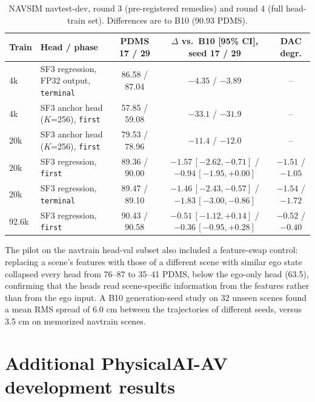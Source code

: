\documentclass[10pt]{article}
\newcommand{\first}{\texttt{first}}
\newcommand{\terminal}{\texttt{terminal}}
\begin{document}
\begin{table}[H]
\caption{NAVSIM navtest-dev, round 3 (pre-registered remedies) and round 4 (full head-train set). Differences are to B10 (90.93 PDMS).}
\begin{center}
\footnotesize
\setlength{\tabcolsep}{3pt}
\begin{tabular}{llccc}
\toprule
Train & Head / phase & PDMS 17 / 29 & $\Delta$ vs.\ B10 [95\% CI], seed 17 / 29 & DAC degr. \\
\midrule
4k & SF3 regression, FP32 output, \terminal{} & 86.58 / 87.04 & $-4.35$ / $-3.89$ & -- \\
4k & SF3 anchor head ($K$=256), \first{} & 57.85 / 59.08 & $-33.1$ / $-31.9$ & -- \\
20k & SF3 anchor head ($K$=256), \first{} & 79.53 / 78.96 & $-11.4$ / $-12.0$ & -- \\
20k & SF3 regression, \first{} & 89.36 / 90.00 & $-1.57\,[-2.62,-0.71]$ / $-0.94\,[-1.95,+0.00]$ & $-1.51$ / $-1.05$ \\
20k & SF3 regression, \terminal{} & 89.47 / 89.10 & $-1.46\,[-2.43,-0.57]$ / $-1.83\,[-3.00,-0.86]$ & $-1.54$ / $-1.72$ \\
92.6k & SF3 regression, \first{} & 90.43 / 90.58 & $-0.51\,[-1.12,+0.14]$ / $-0.36\,[-0.95,+0.28]$ & $-0.52$ / $-0.40$ \\
\bottomrule
\end{tabular}
\end{center}
\end{table}

The pilot on the navtrain head-val subset also included a feature-swap control: replacing a scene's features with those of a different scene with similar ego state collapsed every head from 76--87 to 35--41 PDMS, below the ego-only head (63.5), confirming that the heads read scene-specific information from the features rather than from the ego input. A B10 generation-seed study on 32 unseen scenes found a mean RMS spread of 6.0 cm between the trajectories of different seeds, versus 3.5 cm on memorized navtrain scenes.

\section{Additional PhysicalAI-AV development results}
\label{app:pai-dev}
\end{document}
